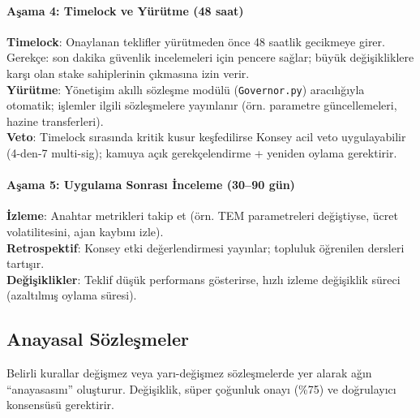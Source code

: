 \documentclass[11pt]{article}
\begin{document}
\begin{itemize}[noitemsep]
\begin{itemize}[noitemsep]
\begin{itemize}[noitemsep]
\begin{itemize}[noitemsep]
\begin{itemize}[noitemsep]
\begin{itemize}[noitemsep]
\begin{itemize}[noitemsep]
\begin{enumerate}[noitemsep]
\begin{itemize}[noitemsep]
\paragraph{Aşama 4: Timelock ve Yürütme (48 saat)}
\textbf{Timelock}: Onaylanan teklifler yürütmeden önce 48 saatlik gecikmeye girer. Gerekçe: son dakika güvenlik incelemeleri için pencere sağlar; büyük değişikliklere karşı olan stake sahiplerinin çıkmasına izin verir.\\
\textbf{Yürütme}: Yönetişim akıllı sözleşme modülü (\texttt{Governor.py}) aracılığıyla otomatik; işlemler ilgili sözleşmelere yayınlanır (örn. parametre güncellemeleri, hazine transferleri).\\
\textbf{Veto}: Timelock sırasında kritik kusur keşfedilirse Konsey acil veto uygulayabilir (4-den-7 multi-sig); kamuya açık gerekçelendirme + yeniden oylama gerektirir.

\paragraph{Aşama 5: Uygulama Sonrası İnceleme (30--90 gün)}
\textbf{İzleme}: Anahtar metrikleri takip et (örn. TEM parametreleri değiştiyse, ücret volatilitesini, ajan kaybını izle).\\
\textbf{Retrospektif}: Konsey etki değerlendirmesi yayınlar; topluluk öğrenilen dersleri tartışır.\\
\textbf{Değişiklikler}: Teklif düşük performans gösterirse, hızlı izleme değişiklik süreci (azaltılmış oylama süresi).

\subsection{Anayasal Sözleşmeler}

Belirli kurallar değişmez veya yarı-değişmez sözleşmelerde yer alarak ağın ``anayasasını'' oluşturur. Değişiklik, süper çoğunluk onayı (\%75) ve doğrulayıcı konsensüsü gerektirir.


\end{itemize}
\end{enumerate}
\end{itemize}
\end{itemize}
\end{itemize}
\end{itemize}
\end{itemize}
\end{itemize}
\end{itemize}
\end{document}
